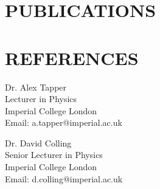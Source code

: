 \documentclass[9pt]{res} %
\begin{document}
\begin{resume}
\section{PUBLICATIONS}



\section{REFERENCES}
\vspace{0.2cm}
\begin{minipage}[t]{0.5\textwidth}
Dr. Alex Tapper\\
Lecturer in Physics\\
Imperial College London\\
Email: a.tapper@imperial.ac.uk
\end{minipage}
\begin{minipage}[t]{0.5\textwidth}
Dr. David Colling\\
Senior Lecturer in Physics\\
Imperial College London\\
Email: d.colling@imperial.ac.uk
\end{minipage}

\end{resume}
\end{document}
